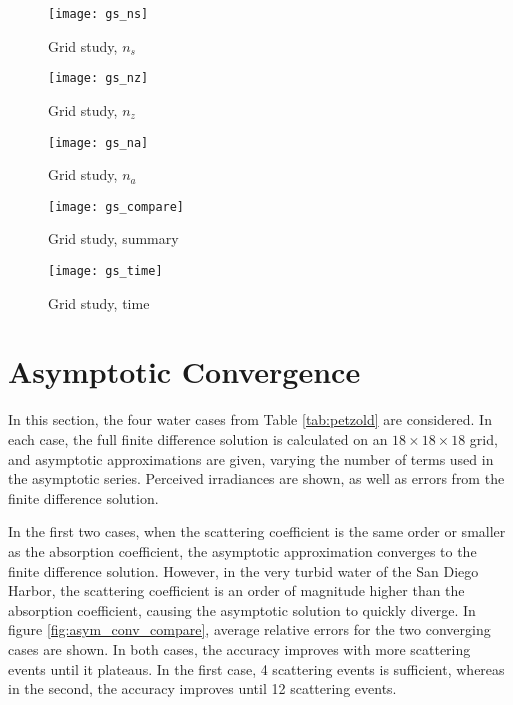 \begin{figure}[h]
  \centering
  \texttt{[image: gs\_ns]}
  \caption{Grid study, $n_s$}
  \label{fig:gs_ns}
\end{figure}

\begin{figure}[h]
  \centering
  \texttt{[image: gs\_nz]}
  \caption{Grid study, $n_z$}
  \label{fig:gs_nz}
\end{figure}

\begin{figure}[h]
  \centering
  \texttt{[image: gs\_na]}
  \caption{Grid study, $n_a$}
  \label{fig:gs_na}
\end{figure}

\begin{figure}[h]
  \centering
  \texttt{[image: gs\_compare]}
  \caption{Grid study, summary}
  \label{fig:gs_compare}
\end{figure}


\begin{figure}[h]
  \centering
  \texttt{[image: gs\_time]}
  \caption{Grid study, time}
  \label{fig:gs_time}
\end{figure}


\section{Asymptotic Convergence}
\label{sec:asym_conv}

In this section, the four water cases from Table \ref{tab:petzold} are considered.
In each case, the full finite difference solution is calculated on an $18 \times 18 \times 18$ grid,
and asymptotic approximations are given, varying the number of terms used in the asymptotic series.
Perceived irradiances are shown, as well as errors from the finite difference solution.

In the first two cases, when the scattering coefficient is the same order or smaller as the absorption coefficient,
the asymptotic approximation converges to the finite difference solution.
However, in the very turbid water of the San Diego Harbor, the scattering coefficient is an order of magnitude higher
than the absorption coefficient, causing the asymptotic solution to quickly diverge.
In figure \ref{fig:asym_conv_compare}, average relative errors for the two converging cases are shown.
In both cases, the accuracy improves with more scattering events until it plateaus.
In the first case, 4 scattering events is sufficient, whereas in the second, the accuracy improves until 12 scattering events.

